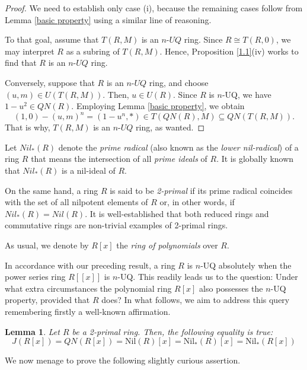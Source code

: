\documentclass[12pt]{amsart}
\newtheorem{lemma}[theorem]{Lemma}
\theoremstyle{definition}
\begin{document}
\begin{proof}
We need to establish only case (i), because the remaining cases follow from Lemma \ref{basic property} using a similar line of reasoning.

To that goal, assume that \( T(R, M) \) is an $n$-$UQ$ ring. Since \( R \cong T(R, 0) \), we may interpret \( R \) as a subring of \( T(R, M) \). Hence, Proposition \ref{1.1}(iv) works to find that \( R \) is an $n$-$UQ$ ring.

Conversely, suppose that \( R \) is an $n$-$UQ$ ring, and choose \( (u, m) \in U(T(R, M)) \). Then, \( u \in U(R) \). Since \( R \) is $n$-UQ, we have \( 1 - u^2 \in QN(R) \). Employing Lemma \ref{basic property}, we obtain
\[
(1, 0) - (u, m)^n = (1 - u^n, *) \in T(QN(R), M) \subseteq QN(T(R, M)).
\]
That is why, \( T(R, M) \) is an $n$-$UQ$ ring, as wanted.
\end{proof}

Let \( Nil_{*}(R) \) denote the {\it prime radical} (also known as the {\it lower nil-radical}) of a ring \( R \) that means the intersection of all {\it prime ideals} of \( R \). It is globally known that \( Nil_{*}(R) \) is a nil-ideal of \( R \).

On the same hand, a ring \( R \) is said to be {\it 2-primal} if its prime radical coincides with the set of all nilpotent elements of \( R \) or, in other words, if \( Nil_{*}(R) = Nil(R) \). It is well-established that both reduced rings and commutative rings are non-trivial examples of 2-primal rings.

As usual, we denote by \( R[x] \) the {\it ring of polynomials} over \( R \).

\medskip

In accordance with our preceding result, a ring $R$ is $n$-UQ absolutely when the power series ring $R[[x]]$ is $n$-UQ. This readily leads us to the question: Under what extra circumstances the polynomial ring $R[x]$ also possesses the $n$-UQ property, provided that $R$ does? In what follows, we aim to address this query remembering firstly a well-known affirmation.

\begin{lemma}\cite[Corollary 3.2.]{daoa}\label{cor 2 primal}
Let $R$ be a 2-primal ring. Then, the following equality is true:
\[ J(R[x]) = QN(R[x]) = \text{Nil}(R)[x] = \text{Nil}_*(R)[x] = \text{Nil}_*(R[x]) \]
\end{lemma}

We now menage to prove the following slightly curious assertion.
\end{document}
